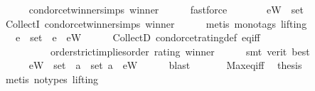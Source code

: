 \begin{isabellebody}
\ \ \ \ \isamarkupfalse%
\ condorcet{\isacharunderscore}{\kern0pt}winner{\isachardot}{\kern0pt}simps\ winner\isanewline
\ \ \ \ \isamarkupfalse%
\ fastforce\isanewline
\ \ \isanewline
\ \ \isamarkupfalse%
\ {}{\isacharcolon}{\kern0pt}\ {\isachardoublequoteopen}{\isacharquery}{\kern0pt}eW\ {\isasymin}\ {\isacharquery}{\kern0pt}set{\isachardoublequoteclose}\isanewline
\ \ \ \ \isamarkupfalse%
\ CollectI\ condorcet{\isacharunderscore}{\kern0pt}winner{\isachardot}{\kern0pt}simps\ winner\isanewline
\ \ \ \ \isamarkupfalse%
\ {\isacharparenleft}{\kern0pt}metis\ {\isacharparenleft}{\kern0pt}mono{\isacharunderscore}{\kern0pt}tags{\isacharcomma}{\kern0pt}\ lifting{\isacharparenright}{\kern0pt}{\isacharparenright}{\kern0pt}\isanewline
\ \ \isanewline
\ \ \isamarkupfalse%
\ {}{\isacharcolon}{\kern0pt}\ {\isachardoublequoteopen}{\isasymforall}\ e\ {\isasymin}\ {\isacharquery}{\kern0pt}set\ {\isachardot}{\kern0pt}\ e\ {\isasymle}\ {\isacharquery}{\kern0pt}eW{\isachardoublequoteclose}\isanewline
\ \ \ \ \isamarkupfalse%
\ CollectD\ condorcet{\isacharunderscore}{\kern0pt}rating{\isacharunderscore}{\kern0pt}def\ eq{\isacharunderscore}{\kern0pt}iff\isanewline
\ \ \ \ \ \ \ \ \ \ order{\isachardot}{\kern0pt}strict{\isacharunderscore}{\kern0pt}implies{\isacharunderscore}{\kern0pt}order\ rating\ winner\isanewline
\ \ \ \ \isamarkupfalse%
\ {\isacharparenleft}{\kern0pt}smt\ {\isacharparenleft}{\kern0pt}verit{\isacharcomma}{\kern0pt}\ best{\isacharparenright}{\kern0pt}{\isacharparenright}{\kern0pt}\isanewline
\ \ \isanewline
\ \ \isamarkupfalse%
\ {}\ {}\ \isamarkupfalse%
\ {}{\isacharcolon}{\kern0pt}\isanewline
\ \ \ \ {\isachardoublequoteopen}{\isacharquery}{\kern0pt}eW\ {\isasymin}\ {\isacharquery}{\kern0pt}set\ {\isasymand}\ {\isacharparenleft}{\kern0pt}{\isasymforall}a\ {\isasymin}\ {\isacharquery}{\kern0pt}set{\isachardot}{\kern0pt}\ a\ {\isasymle}\ {\isacharquery}{\kern0pt}eW{\isacharparenright}{\kern0pt}{\isachardoublequoteclose}\isanewline
\ \ \ \ \isamarkupfalse%
\ blast\isanewline
\ \ \isamarkupfalse%
\ {}\ {}\ {}\ Max{\isacharunderscore}{\kern0pt}eq{\isacharunderscore}{\kern0pt}iff\ \isamarkupfalse%
\ {\isacharquery}{\kern0pt}thesis\isanewline
\ \ \ \ \isamarkupfalse%
\ {\isacharparenleft}{\kern0pt}metis\ {\isacharparenleft}{\kern0pt}no{\isacharunderscore}{\kern0pt}types{\isacharcomma}{\kern0pt}\ lifting{\isacharparenright}{\kern0pt}{\isacharparenright}{\kern0pt}\isanewline

\end{isabellebody}
